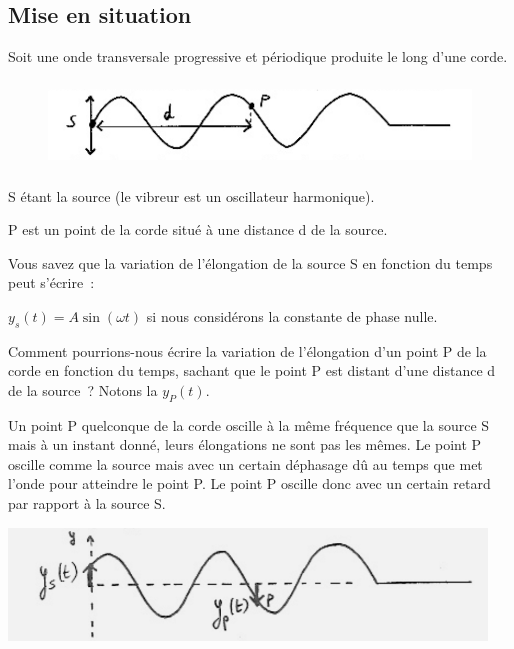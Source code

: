 \subsection{Mise en situation}

Soit une onde transversale progressive et périodique produite le long
d'une corde.
\begin{figure}
\centering
\includegraphics[width=13.645cm,height=2.305cm]{Pictures/10000001000003340000008AA6B62AF7250A4682.png}
\caption{}
\end{figure}

\begin{description}
\item{S} étant la source (le vibreur est un oscillateur harmonique).
\item{P} est un point de la corde situé à une distance d de la source.
\end{description}

Vous savez que la variation de l'élongation de la source S en fonction
du temps peut s'écrire~:

$y_{s}(t) = A \sin (\omega t )$ si nous considérons la constante de
phase nulle.

Comment pourrions-nous écrire la variation de l'élongation d'un point
  P de la corde en fonction du temps, sachant que le point P est distant
  d'une distance d de la source~? Notons la $y_P(t)$.

Un point P quelconque de la corde oscille à la même fréquence que la
source S mais à un instant donné, leurs élongations ne sont pas les
mêmes. Le point P oscille comme la source mais avec un certain déphasage
dû au temps que met l'onde pour atteindre le point P. Le point P oscille
donc avec un certain retard par rapport à la source S.

\includegraphics[width=12.696cm,height=2.99cm]{Pictures/100000010000034A000000C6944A1FC3E4803CD5.png}

